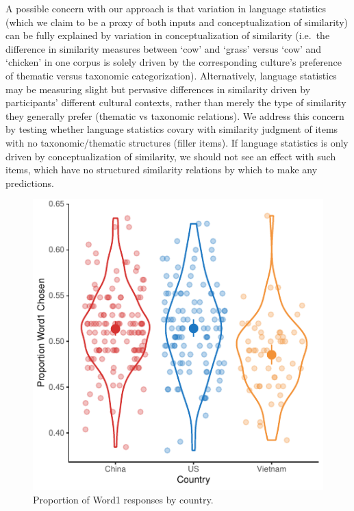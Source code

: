 \documentclass[10pt, letterpaper]{article}
\newenvironment{CodeChunk}{}{}
\begin{document}
A possible concern with our approach is that variation in language
statistics (which we claim to be a proxy of both inputs and
conceptualization of similarity) can be fully explained by variation in
conceptualization of similarity (i.e.~the difference in similarity
measures between `cow' and `grass' versus `cow' and `chicken' in one
corpus is solely driven by the corresponding culture's preference of
thematic versus taxonomic categorization). Alternatively, language
statistics may be measuring slight but pervasive differences in
similarity driven by participants' different cultural contexts, rather
than merely the type of similarity they generally prefer (thematic vs
taxonomic relations). We address this concern by testing whether
language statistics covary with similarity judgment of items with no
taxonomic/thematic structures (filler items). If language statistics is
only driven by conceptualization of similarity, we should not see an
effect with such items, which have no structured similarity relations by
which to make any predictions.~

\begin{CodeChunk}
\begin{figure}[tb]

{\centering \includegraphics{figs/unnamed-chunk-4-1} 

}

\caption[Proportion of Word1 responses by country]{Proportion of Word1 responses by country.}\label{fig:unnamed-chunk-4}
\end{figure}
\end{CodeChunk}
\end{document}
